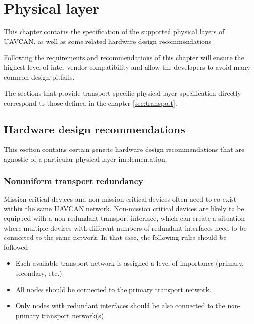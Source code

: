 \chapter{Physical layer}\label{sec:physical}

This chapter contains the specification of the supported physical layers of UAVCAN,
as well as some related hardware design recommendations.

Following the requirements and recommendations of this chapter will ensure the highest level of
inter-vendor compatibility and allow the developers to avoid many common design pitfalls.

The sections that provide transport-specific physical layer specification
directly correspond to those defined in the chapter \ref{sec:transport}.

\clearpage

\clearpage
\section{Hardware design recommendations}

This section contains certain generic hardware design recommendations that are agnostic of a particular
physical layer implementation.

\subsection{Nonuniform transport redundancy}\label{sec:physical_nonuniform_transport_redundancy}

Mission critical devices and non-mission critical devices often need to co-exist within the same UAVCAN network.
Non-mission critical devices are likely to be equipped with a non-redundant transport interface,
which can create a situation where multiple devices with different numbers of redundant interfaces
need to be connected to the same network.
In that case, the following rules should be followed:

\begin{itemize}
    \item Each available transport network is assigned a level of importance (primary, secondary, etc.).
    \item All nodes should be connected to the primary transport network.
    \item Only nodes with redundant interfaces should be also connected to the non-primary transport network(s).
\end{itemize}

